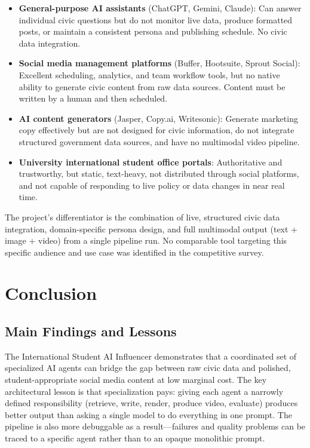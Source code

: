 \documentclass[12pt, letterpaper]{article}
\begin{document}
\begin{itemize}[leftmargin=1.5em]
  \item \textbf{General-purpose AI assistants} (ChatGPT, Gemini, Claude): Can answer
    individual civic questions but do not monitor live data, produce formatted posts,
    or maintain a consistent persona and publishing schedule. No civic data integration.
  \item \textbf{Social media management platforms} (Buffer, Hootsuite, Sprout Social):
    Excellent scheduling, analytics, and team workflow tools, but no native ability to
    generate civic content from raw data sources. Content must be written by a human
    and then scheduled.
  \item \textbf{AI content generators} (Jasper, Copy.ai, Writesonic): Generate
    marketing copy effectively but are not designed for civic information, do not
    integrate structured government data sources, and have no multimodal video pipeline.
  \item \textbf{University international student office portals}: Authoritative and
    trustworthy, but static, text-heavy, not distributed through social platforms, and
    not capable of responding to live policy or data changes in near real time.
\end{itemize}

The project's differentiator is the combination of live, structured civic data
integration, domain-specific persona design, and full multimodal output (text + image
+ video) from a single pipeline run. No comparable tool targeting this specific
audience and use case was identified in the competitive survey.

\newpage

\section{Conclusion}

\subsection{Main Findings and Lessons}

The International Student AI Influencer demonstrates that a coordinated set of
specialized AI agents can bridge the gap between raw civic data and polished,
student-appropriate social media content at low marginal cost. The key architectural
lesson is that specialization pays: giving each agent a narrowly defined responsibility
(retrieve, write, render, produce video, evaluate) produces better output than asking
a single model to do everything in one prompt. The pipeline is also more debuggable
as a result---failures and quality problems can be traced to a specific agent rather
than to an opaque monolithic prompt.
\end{document}
